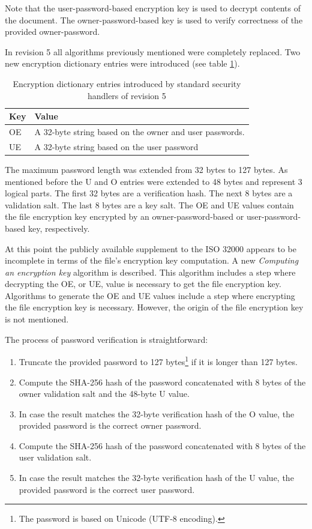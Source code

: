 \documentclass[11pt,oneside]{fithesis2}
\begin{document}
Note that the user-password-based encryption key is used to decrypt contents of the document. The owner-password-based key is used to verify correctness of the provided owner-password.

In revision 5 all algorithms previously mentioned were completely replaced. Two new encryption dictionary entries were introduced (see table \ref{additional_handler_entries}). 

\begin{table}[h]
	\centering
	\begin{tabular}{|l|l|}
               \hline
		\textbf{Key}&\textbf{Value}\\
	\hline
		OE&A 32-byte string based on the owner and user passwords.\\
		UE&A 32-byte string based on the user password\\
	\hline
           \end{tabular}
	\caption{Encryption dictionary entries introduced by standard security handlers of revision 5}
	\label{additional_handler_entries}
\end{table}

The maximum password length was extended from 32 bytes to 127 bytes. As mentioned before the U and O entries were extended to 48 bytes and represent 3 logical parts. The first 32 bytes are a verification hash. The next 8 bytes are a validation salt. The last 8 bytes are a key salt. The OE and UE values contain the file encryption key encrypted by an owner-password-based or user-password-based key, respectively.

At this point the publicly available supplement to the ISO 32000 \cite{iso32000sup} appears to be incomplete in terms of the file's encryption key computation. A new \textit{Computing an encryption key} algorithm is described. This algorithm includes a step where decrypting the OE, or UE, value is necessary to get the file encryption key. Algorithms to generate the OE and UE values include a step where encrypting the file encryption key is necessary. However, the origin of the file encryption key is not mentioned. 

The process of password verification is straightforward:

\begin{enumerate}
\setlength\itemsep{0.1em}
\item{Truncate the provided password to 127 bytes\footnote{The password is based on Unicode (UTF-8 encoding).} if it is longer than 127 bytes.}
\item{Compute the SHA-256 hash of the password concatenated with 8 bytes of the owner validation salt and the 48-byte U value.}
\item{In case the result matches the 32-byte verification hash of the O value, the provided password is the correct owner password.}
\item{Compute the SHA-256 hash of the password concatenated with 8 bytes of the user validation salt.}
\item{In case the result matches the 32-byte verification hash of the U value, the provided password is the correct user password.}
\end{enumerate}
\end{document}
